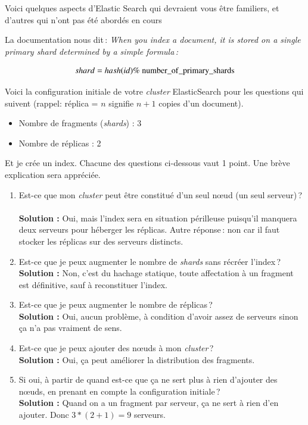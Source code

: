 \documentclass[11pt,a4paper]{article}
\newenvironment{solution}[0]{
~\\ \color{red} \textbf{Solution : }\color{black}}{%
}
\begin{document}
Voici quelques aspects d'Elastic Search qui devraient vous être familiers, 
et d'autres qui n'ont pas été abordés en cours

La documentation nous dit\,:
\textit{When you index a document, it is stored on a single primary shard determined by a simple formula\,:}

    $$shard = hash(id) \%\ \rm{number\_of\_primary\_shards}$$
    
Voici la configuration initiale de votre \textit{cluster} ElasticSearch pour les questions qui suivent 
(rappel: réplica = $n$ signifie $n+1$ copies d'un document).

   \begin{itemize}
      \item Nombre de fragments (\textit{shards}) : 3
       \item Nombre de réplicas : 2
   \end{itemize} 

Et je crée un index. Chacune des questions ci-dessous vaut 1 point. Une brève explication sera appréciée.

\begin{enumerate}
       \item Est-ce que mon \textit{cluster} peut être constitué d'un seul n{\oe}ud (un seul serveur)\,?
\begin{solution}
Oui, mais l'index sera en situation périlleuse puisqu'il manquera deux serveurs pour 
héberger les réplicas. Autre réponse\,: non car il faut stocker les réplicas sur des serveurs distincts.
\end{solution}

       \item Est-ce que je peux augmenter le nombre de \textit{shards} sans récréer l'index\,?
\begin{solution}
Non, c'est du hachage statique, toute affectation à un fragment est définitive, sauf à reconstituer l'index.
\end{solution}
       \item Est-ce que je peux augmenter le nombre de réplicas\,?
\begin{solution}
Oui, aucun problème, à condition d'avoir assez de serveurs sinon ça n'a pas vraiment de sens.
\end{solution}
       \item Est-ce que je peux ajouter des n{\oe}uds à mon \textit{cluster}\,?
\begin{solution}
Oui, ça peut améliorer la distribution des fragments.
\end{solution}
       \item Si oui, à partir de quand est-ce que ça ne sert plus à rien d'ajouter des n{\oe}uds, en prenant
            en compte la configuration initiale\,?
\begin{solution}
Quand on a un fragment par serveur, ça ne sert à rien d'en ajouter. Donc $3*(2+1)=9$ serveurs.
\end{solution}
    \end{enumerate}
\end{document}
